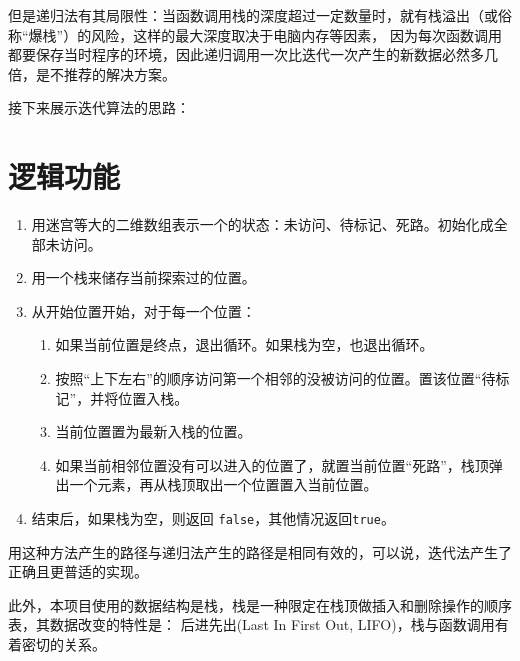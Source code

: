 但是递归法有其局限性：当函数调用栈的深度超过一定数量时，就有{\kaishu 栈溢出}（或俗称“爆栈”）的风险，这样的最大深度取决于电脑内存等因素，%
因为每次函数调用都要保存当时程序的环境，因此递归调用一次比迭代一次产生的新数据必然多几倍，是不推荐的解决方案。

接下来展示迭代算法的思路：


\section{逻辑功能}

\begin{enumerate}
    \item 用迷宫等大的二维数组表示一个的状态：未访问、待标记、死路。初始化成全部未访问。
    \item 用一个栈来储存当前探索过的位置。
    \item 从开始位置开始，对于每一个位置：
    \begin{enumerate}
        \item 如果当前位置是终点，退出循环。如果栈为空，也退出循环。
        \item 按照“上下左右”的顺序访问第一个相邻的没被访问的位置。置该位置“待标记”，并将位置入栈。
        \item 当前位置置为最新入栈的位置。
        \item 如果当前相邻位置没有可以进入的位置了，就置当前位置“死路”，栈顶弹出一个元素，再从栈顶取出一个位置置入当前位置。
    \end{enumerate}
    \item 结束后，如果栈为空，则返回 \lstinline{false}，其他情况返回\lstinline{true}。
\end{enumerate}


用这种方法产生的路径与递归法产生的路径是相同有效的，可以说，迭代法产生了正确且更普适的实现。

此外，本项目使用的数据结构是{\kaishu 栈}，栈是一种限定在{\kaishu 栈顶}做插入和删除操作的顺序表，其数据改变的特性是：%
{后进先出(Last In First Out, LIFO)}，栈与函数调用有着密切的关系。

